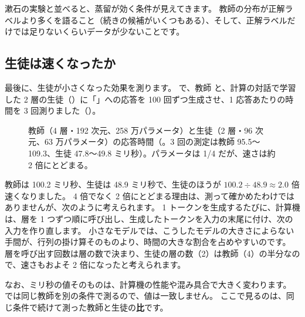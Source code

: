 漱石の実験と並べると、蒸留が効く条件が見えてきます。
教師の分布が正解ラベルより多くを語ること（続きの候補がいくつもある）、そして、正解ラベルだけでは足りないくらいデータが少ないことです。

\subsection{生徒は速くなったか}\label{sec:distill-exp-speed}

最後に、生徒が小さくなった効果を測ります。
 で、教師  と、計算の対話で学習した 2 層の生徒（）に「」への応答を 100 回ずつ生成させ、1 応答あたりの時間を 3 回測りました（）。

\begin{figure}[tbp]
\centering
{}
\caption{教師（4 層・192 次元、258 万パラメータ）と生徒（2 層・96 次元、63 万パラメータ）の応答時間（。3 回の測定は教師 95.5〜109.3、生徒 47.8〜49.8 ミリ秒）。パラメータは 1/4 だが、速さは約 2 倍にとどまる。}
\label{fig:distill-speed}
\end{figure}

教師は 100.2 ミリ秒、生徒は 48.9 ミリ秒で、生徒のほうが $100.2\div48.9\approx2.0$ 倍速くなりました。
4 倍でなく 2 倍にとどまる理由は、測って確かめたわけではありませんが、次のように考えられます。
1 トークンを生成するたびに、計算機は、層を 1 つずつ順に呼び出し、生成したトークンを入力の末尾に付け、次の入力を作り直します。
小さなモデルでは、こうしたモデルの大きさによらない手間が、行列の掛け算そのものより、時間の大きな割合を占めやすいのです。
層を呼び出す回数は層の数で決まり、生徒の層の数（2）は教師（4）の半分なので、速さもおよそ 2 倍になったと考えられます。

なお、ミリ秒の値そのものは、計算機の性能や混み具合で大きく変わります。
では同じ教師を別の条件で測るので、値は一致しません。
ここで見るのは、同じ条件で続けて測った教師と生徒の\textbf{比}です。

